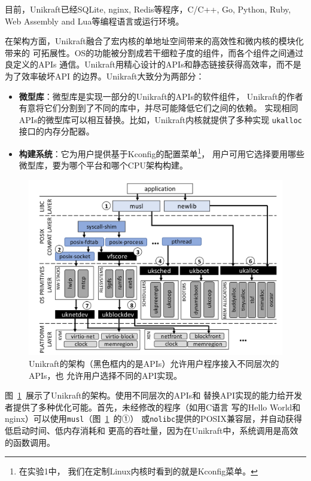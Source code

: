 \documentclass[UTF8,fontset=none,linespread=1.15]{ctexart}
\begin{document}
目前，Unikraft已经SQLite, nginx, Redis等程序，C/C++, Go, Python, Ruby,
Web Assembly and Lua等编程语言或运行环境。

在架构方面，Unikraft融合了宏内核的单地址空间带来的高效性和微内核的模块化带来的
可拓展性。OS的功能被分割成若干细粒子度的组件，而各个组件之间通过良定义的APIs
通信。Unikraft用精心设计的APIs和静态链接获得高效率，而不是为了效率破坏API
的边界。Unikraft大致分为两部分：
\begin{itemize}
\item \textbf{微型库}：微型库是实现一部分的Unikraft的APIs的软件组件，
Unikraft的作者有意将它们分割到了不同的库中，并尽可能降低它们之间的依赖。
实现相同APIs的微型库可以相互替换。比如，Unikraft内核就提供了多种实现
\texttt{ukalloc}接口的内存分配器。
\item \textbf{构建系统}：它为用户提供基于Kconfig的配置菜单\footnote{在实验1中，
我们在定制Linux内核时看到的就是Kconfig菜单。}，
用户可用它选择要用哪些微型库，要为哪个平台和哪个CPU架构构建。
\end{itemize}
\begin{figure}[!hbt]
\includegraphics[width=\linewidth]{pictures/Unikraft-architecture.png}
\caption{Unikraft的架构（黑色框内的是APIs）允许用户程序接入不同层次的APIs，也
允许用户选择不同的API实现。}\label{fig:unikraft-arch}
\end{figure}

图\ \ref{fig:unikraft-arch}\ 展示了Unikraft的架构。使用不同层次的APIs和
替换API实现的能力给开发者提供了多种优化可能。首先，未经修改的程序（如用C语言
写的Hello World和nginx）可以使用\texttt{musl}（图\ \ref{fig:unikraft-arch}\ 的①）
或\texttt{nolibc}提供的POSIX兼容层，并自动获得低启动时间、低内存消耗和
更高的吞吐量，因为在Unikraft中，系统调用是高效的函数调用。
\end{document}
